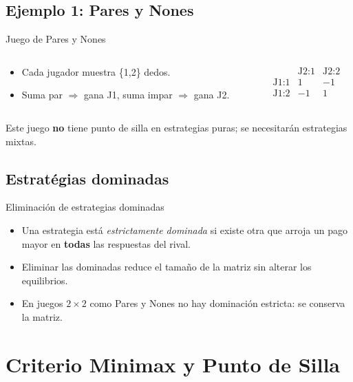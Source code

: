 \documentclass{beamer}
\begin{document}
\subsection{Ejemplo 1: Pares y Nones}
\begin{frame}{Juego de Pares y Nones}
\begin{columns}
\begin{column}{0.55\textwidth}
\begin{itemize}[<+->]
  \item Cada jugador muestra \{1,2\} dedos.
  \item Suma par $\Rightarrow$ gana J1, suma impar $\Rightarrow$ gana J2.
\end{itemize}
\end{column}
\begin{column}{0.4\textwidth}
\[
\begin{array}{c|cc}
      & \text{J2:1} & \text{J2:2}\\\hline
\text{J1:1} &  1 & -1\\
\text{J1:2} & -1 &  1
\end{array}
\]
\end{column}
\end{columns}
\vspace{0.2cm}
Este juego \textbf{no} tiene punto de silla en estrategias puras; se necesitarán estrategias mixtas.
\end{frame}

\subsection{Estratégias dominadas}
\begin{frame}{Eliminación de estrategias dominadas}
\begin{itemize}[<+->]
  \item Una estrategia está \emph{estrictamente dominada} si existe otra que arroja un pago mayor en \textbf{todas} las respuestas del rival.
  \item Eliminar las dominadas reduce el tamaño de la matriz sin alterar los equilibrios.
  \item En juegos $2\times2$ como Pares y Nones no hay dominación estricta: se conserva la matriz.
\end{itemize}
\end{frame}

\section{Criterio Minimax y Punto de Silla}
\end{document}
